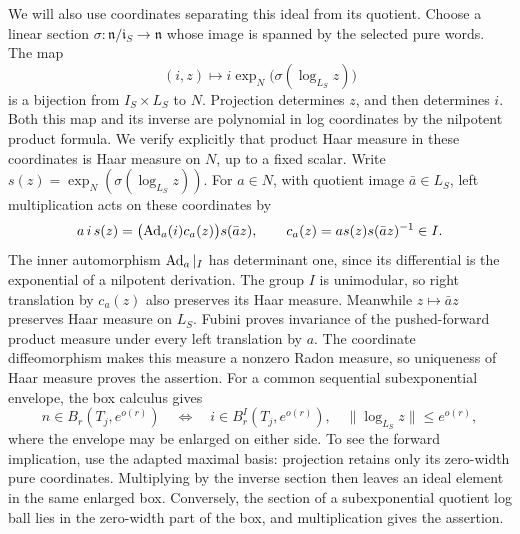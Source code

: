We will also use coordinates separating this ideal from its quotient.
Choose a linear section
$\sigma:\mathfrak n/\mathfrak i_S\to\mathfrak n$ whose image is spanned by
the selected pure words.  The map
\begin{equation}
 (i,z)\longmapsto i\exp_N\bigl(\sigma(\log_{L_S}z)\bigr)
 \label{eq:ideal-section-coordinates}
\end{equation}
is a bijection from $I_S\times L_S$ to $N$.  Projection determines $z$,
and then determines $i$.  Both this map and its inverse are polynomial in
log coordinates by the nilpotent product formula.  We verify explicitly
that product Haar measure in these coordinates is Haar measure on $N$,
up to a fixed scalar.  Write $s(z)=\exp_N(\sigma(\log_{L_S}z))$.
For $a\in N$, with quotient image $\bar a\in L_S$, left multiplication
acts on these coordinates by
\[
 a\,i\,s(z)=\bigl(\operatorname{Ad}_a(i)c_a(z)\bigr)s(\bar a z),
 \qquad c_a(z)=a s(z)s(\bar a z)^{-1}\in I.
\]
The inner automorphism $\operatorname{Ad}_a|_I$ has determinant one, since its
differential is the exponential of a nilpotent derivation.  The group
$I$ is unimodular, so right translation by $c_a(z)$ also preserves its
Haar measure.  Meanwhile $z\mapsto\bar a z$ preserves Haar measure on
$L_S$.  Fubini proves invariance of the pushed-forward product measure
under every left translation by $a$.  The coordinate diffeomorphism
makes this measure a nonzero Radon measure, so uniqueness of Haar
measure proves the assertion.
For a common sequential subexponential envelope, the box calculus gives
\begin{equation}
 n\in B_r(T_j,e^{o(r)})
 \quad\Longleftrightarrow\quad
 i\in B^I_r(T_j,e^{o(r)}),\quad
 \|\log_{L_S}z\|\le e^{o(r)},
 \label{eq:ideal-section-boxes}
\end{equation}
where the envelope may be enlarged on either side.  To see the forward
implication, use the adapted maximal basis: projection retains only its
zero-width pure coordinates.  Multiplying by the inverse section then
leaves an ideal element in the same enlarged box.  Conversely, the section
of a subexponential quotient log ball lies in the zero-width part of the
box, and multiplication gives the assertion.

